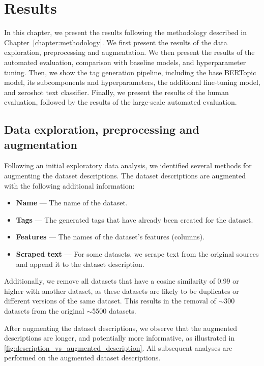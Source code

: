 \chapter{Results}\label{chapter:results}

In this chapter, we present the results following the methodology described in Chapter~\ref{chapter:methodology}. We first present the results of the data exploration, preprocessing and augmentation. We then present the results of the automated evaluation, comparison with baseline models, and hyperparameter tuning. Then, we show the tag generation pipeline, including the base BERTopic model, its subcomponents and hyperparameters, the additional fine-tuning model, and zeroshot text classifier. Finally, we present the results of the human evaluation, followed by the results of the large-scale automated evaluation.

\section{Data exploration, preprocessing and augmentation}
\label{sec:data_exploration}
Following an initial exploratory data analysis, we identified several methods for augmenting the dataset descriptions. The dataset descriptions are augmented with the following additional information:

\begin{itemize}
    \item \textbf{Name} — The name of the dataset.
    \item \textbf{Tags} — The generated tags that have already been created for the dataset.
    \item \textbf{Features} — The names of the dataset's features (columns).
    \item \textbf{Scraped text} — For some datasets, we scrape text from the original sources and append it to the dataset description.
\end{itemize}

Additionally, we remove all datasets that have a cosine similarity of 0.99 or higher with another dataset, as these datasets are likely to be duplicates or different versions of the same dataset. This results in the removal of $\sim$300 datasets from the original $\sim$5500 datasets.

After augmenting the dataset descriptions, we observe that the augmented descriptions are longer, and potentially more informative, as illustrated in \cref{fig:description_vs_augmented_description}. All subsequent analyses are performed on the augmented dataset descriptions.

